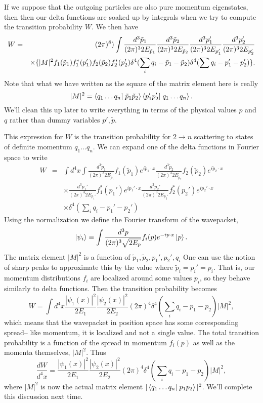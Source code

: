 If we suppose that the outgoing particles are also pure momentum eigenstates, then then our delta functions are soaked up by integrals when we try to compute the transition probability $W$. We then have
\begin{eqnarray*}
W&=&(2\pi)^8)\int \frac{d^3 \tilde p_1}{(2\pi)^3 2E_{\tilde p_1}} \frac{d^3 \tilde p_2}{(2\pi)^3 2E_{\tilde p_2}} \frac{d^3 p_1'}{(2\pi)^3 2E_{p_1'}} \frac{d^3 p_2'}{(2\pi)^3 2E_{p_2'}}\\ &&\times\{|M|^2 f_1(\tilde p_1)f_1^* (p_1')f_2(\tilde p_2)f_2^*(p_2')\delta^4(\sum_i q_i -\tilde p_1 -\tilde p_2)\delta^4(\sum q_i-p_1' -p_2')\}.
\end{eqnarray*}
Note that what we have written as the square of the matrix element here is really $$|M|^2=\braket{q_1\ldots q_n}{\tilde p_1 \tilde p_2}\braket{p_1'p_2'}{q_1\ldots q_n}.$$ We'll clean this up later to write everything in terms of the physical values $p$ and $q$ rather than dummy variables $p', \tilde p.$

This expression for $W$ is the transition probability for $2\to n$ scattering to states of definite momentum $q_1\ldots q_n$.
We can expand one of the delta functions in Fourier space to write 
\begin{eqnarray*}
W&=&\int d^4x \int \frac{d^3\tilde p_1}{(2\pi)^3 2E_{\tilde p_1}} f_1(\tilde p_1) e^{i\tilde p_1 \cdot x}\frac{d^3\tilde p_2}{(2\pi)^3 2E_{\tilde p_2}} f_2(\tilde p_2) e^{i\tilde p_2 \cdot x}\\
&&\times \frac{d^3 p_1'}{(2\pi)^3 2E_{p_1'}} f_1^*(p_1') e^{ip_1' \cdot x} \frac{d^3 p_2'}{(2\pi)^3 2E_{p_2'}} f_2^*(p_2') e^{ip_2' \cdot x}\\
&&\times\delta^4(\sum_i q_i - p_1'-p_2')
\end{eqnarray*}
Using the normalization we define the Fourier transform of the wavepacket,
$$\left| \psi_i \right>\equiv \int \frac{d^3p}{(2\pi)^3\sqrt{2E_p}}f_i(p) e^{-ip\cdot x}\left| p \right>.$$
The matrix element $|M|^2$ is a function of $\tilde p_1, \tilde p_2,p_1', p_2', q_i$ One can use the notion of sharp peaks to approximate this by the value where $\tilde p_i=p_i' = p_i.$ That is, our momentum distributions $f_i$ are localized around some values $p_i$, so they behave similarly to delta functions. Then the transition probability becomes
$$W=\int d^4x \frac{|\psi_1 (x)|^2}{2E_1}\frac{|\psi_2(x)|^2}{2E_2}(2\pi)^4 \delta^4(\sum_i q_i-p_1-p_2)|M|^2,$$
which means that the wavepacket in position space has some corresponding spread-- like momentum, it is localized and not a single value. The total transition probability is a function of the spread in momentum $f_i(p)$ as well as the momenta themselves, $|M|^2$. Thus
$$\frac{dW}{d^4x}=\frac{|\psi_1 (x)|^2}{2E_1}\frac{|\psi_2(x)|^2}{2E_2}(2\pi)^4 \delta^4(\sum_i q_i-p_1-p_2)|M|^2,$$
where $|M|^2$ is now the actual matrix element $|\braket{q_1\ldots q_n}{p_1p_2}|^2$. We'll complete this discussion next time.
